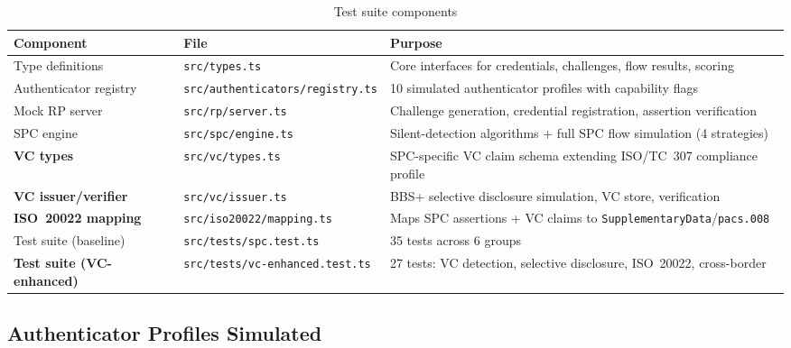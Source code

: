 \documentclass[12pt,a4paper]{article}
\begin{document}
\begin{table}[h]
\centering
\caption{Test suite components}
\label{tab:architecture}
\begin{tabularx}{\textwidth}{llX}
\toprule
\textbf{Component} & \textbf{File} & \textbf{Purpose} \\
\midrule
Type definitions & \texttt{src/types.ts} & Core interfaces for credentials, challenges, flow results, scoring \\
Authenticator registry & \texttt{src/authenticators/registry.ts} & 10 simulated authenticator profiles with capability flags \\
Mock RP server & \texttt{src/rp/server.ts} & Challenge generation, credential registration, assertion verification \\
SPC engine & \texttt{src/spc/engine.ts} & Silent-detection algorithms + full SPC flow simulation (4 strategies) \\
\textbf{VC types} & \texttt{src/vc/types.ts} & SPC-specific VC claim schema extending ISO/TC~307 compliance profile \\
\textbf{VC issuer/verifier} & \texttt{src/vc/issuer.ts} & BBS+ selective disclosure simulation, VC store, verification \\
\textbf{ISO~20022 mapping} & \texttt{src/iso20022/mapping.ts} & Maps SPC assertions + VC claims to \texttt{SupplementaryData}/\texttt{pacs.008} \\
Test suite (baseline) & \texttt{src/tests/spc.test.ts} & 35 tests across 6 groups \\
\textbf{Test suite (VC-enhanced)} & \texttt{src/tests/vc-enhanced.test.ts} & 27 tests: VC detection, selective disclosure, ISO~20022, cross-border \\
\bottomrule
\end{tabularx}
\end{table}

\subsection{Authenticator Profiles Simulated}
\end{document}

